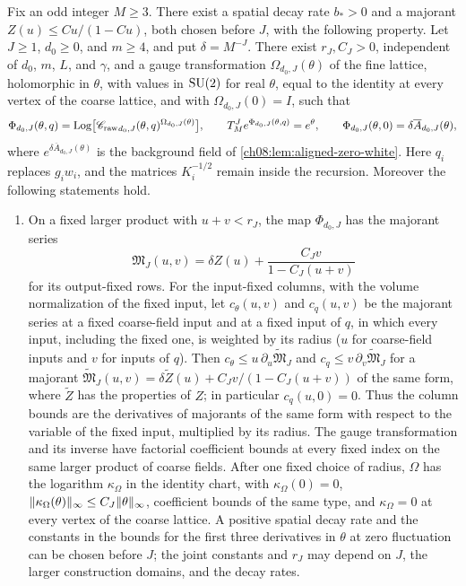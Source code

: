 \begin{theorem}\label{ch10:thm:whole-image-gauge}
Fix an odd integer $M\ge3$. There exist a spatial decay rate $b_*>0$ and a majorant $Z(u)\le Cu/(1-Cu)$, both chosen before $J$, with the following property. Let $J\ge1$, $d_0\ge0$, and $m\ge4$, and put $\delta=M^{-J}$. There exist $r_J,C_J>0$, independent of $d_0$, $m$, $L$, and $\gamma$, and a gauge transformation $\Omega_{d_0,J}(\theta)$ of the fine lattice, holomorphic in $\theta$, with values in $\mathrm{SU}(2)$ for real $\theta$, equal to the identity at every vertex of the coarse lattice, and with $\Omega_{d_0,J}(0)=I$, such that
\[
 \Phi_{d_0,J}(\theta,q)=\operatorname{Log}\bigl[{\mathscr C_{\mathrm{raw}}}_{d_0,J}(\theta,q)^{\Omega_{d_0,J}(\theta)}\bigr],\qquad
 T_M^Je^{\Phi_{d_0,J}(\theta,q)}=e^\theta,\qquad
 \Phi_{d_0,J}(\theta,0)=\delta\overline A_{d_0,J}(\theta),
\]
where $e^{\delta\overline A_{d_0,J}(\theta)}$ is the background field of \cref{ch08:lem:aligned-zero-white}. Here $q_i$ replaces $g_iw_i$, and the matrices $K_i^{-1/2}$ remain inside the recursion. Moreover the following statements hold.
\begin{enumerate}
\item On a fixed larger product with $u+v<r_J$, the map $\Phi_{d_0,J}$ has the majorant series
\[
 \mathfrak M_J(u,v)=\delta Z(u)+\frac{C_Jv}{1-C_J(u+v)}
\]
for its output-fixed rows. For the input-fixed columns, with the volume normalization of the fixed input, let $c_\theta(u,v)$ and $c_q(u,v)$ be the majorant series at a fixed coarse-field input and at a fixed input of $q$, in which every input, including the fixed one, is weighted by its radius ($u$ for coarse-field inputs and $v$ for inputs of $q$). Then $c_\theta\le u\,\partial_u\widetilde{\mathfrak M}_J$ and $c_q\le v\,\partial_v\widetilde{\mathfrak M}_J$ for a majorant $\widetilde{\mathfrak M}_J(u,v)=\delta\widetilde Z(u)+C_Jv/(1-C_J(u+v))$ of the same form, where $\widetilde Z$ has the properties of $Z$; in particular $c_q(u,0)=0$. Thus the column bounds are the derivatives of majorants of the same form with respect to the variable of the fixed input, multiplied by its radius. The gauge transformation and its inverse have factorial coefficient bounds at every fixed index on the same larger product of coarse fields. After one fixed choice of radius, $\Omega$ has the logarithm $\kappa_\Omega$ in the identity chart, with $\kappa_\Omega(0)=0$, $\lVert \kappa_\Omega(\theta)\rVert_\infty\le C_J\lVert \theta\rVert_\infty$, coefficient bounds of the same type, and $\kappa_\Omega=0$ at every vertex of the coarse lattice. A positive spatial decay rate and the constants in the bounds for the first three derivatives in $\theta$ at zero fluctuation can be chosen before $J$; the joint constants and $r_J$ may depend on $J$, the larger construction domains, and the decay rates.

\end{enumerate}
\end{theorem}
